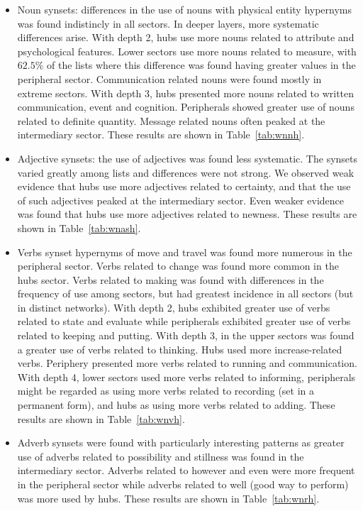 \begin{itemize}
\item Noun synsets: differences in the use of nouns with physical entity hypernyms was found indistincly in all sectors.
In deeper layers, more systematic differences arise.
With depth 2, hubs use more nouns related to attribute and psychological features.
Lower sectors use more nouns related to measure,
with $62.5\%$ of the lists where this difference was found having greater values in the peripheral sector.
Communication related nouns were found mostly in extreme sectors.
With depth 3, hubs presented more nouns related to written communication, event and cognition.
Peripherals showed greater use of nouns related to definite quantity.
Message related nouns often peaked at the intermediary sector.
These results are shown in Table~\ref{tab:wnnh}.
\FloatBarrier
\item Adjective synsets: the use of adjectives was found less systematic.
The synsets varied greatly among lists and differences were not strong.
We observed weak evidence that hubs use more adjectives related to certainty,
and that the use of such adjectives peaked at the intermediary sector.
Even weaker evidence was found that hubs use more adjectives related to newness.
These results are shown in Table~\ref{tab:wnash}.
\FloatBarrier
\item Verbs synset hypernyms of move and travel was found more numerous in the peripheral sector.
Verbs related to change was found more common in the hubs sector.
Verbs related to making was found with differences in the frequency of use among sectors,
but had greatest incidence in all sectors (but in distinct networks).
With depth 2, hubs exhibited greater use of verbs related to state and evaluate while
peripherals exhibited greater use of verbs related to keeping and putting.
With depth 3, in the upper sectors was found a greater use of verbs related to thinking.
Hubs used more increase-related verbs.
Periphery presented more verbs related to running and communication.
With depth 4, lower sectors used more verbs related to informing, peripherals might be regarded as using more verbs related to recording (set in a permanent form), and hubs as using more verbs related to adding.
These results are shown in Table~\ref{tab:wnvh}.
\FloatBarrier
\item Adverb synsets were found with particularly interesting patterns as greater use of adverbs related to possibility and stillness was found in the intermediary sector.
Adverbs related to however and even were more frequent in the peripheral sector while adverbs related to well (good way to perform) was more used by hubs.
These results are shown in Table~\ref{tab:wnrh}.
\FloatBarrier
\end{itemize}

